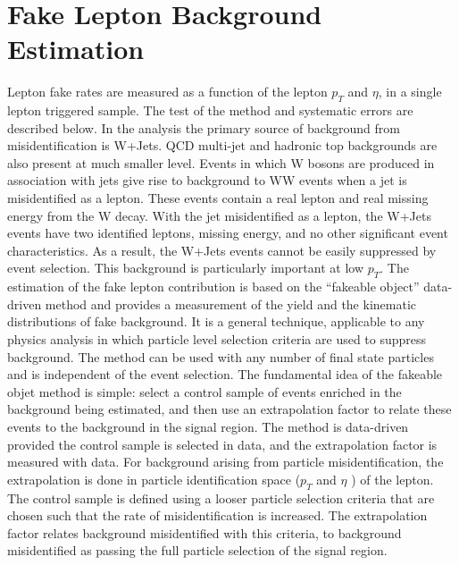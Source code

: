 \section{Fake Lepton Background Estimation}
\label{fk}
Lepton fake rates are measured as a
function of the lepton $p_T$ and $\eta$, in a single lepton triggered sample. The test of the method and
systematic errors are described below.
In the analysis
the primary source of background from misidentification is W+Jets. QCD multi-jet and hadronic top backgrounds
are also present at much smaller level. Events in which W bosons are produced in association
with jets give rise to background to WW events when a jet is misidentified as a lepton. These
events contain a real lepton and real missing energy from the W decay. With the jet misidentified 
as a lepton, the W+Jets events have two identified leptons, missing energy, and no other
significant event characteristics. As a result, the W+Jets events cannot be easily suppressed
by event selection. This background is particularly important at low $p_T$.
The estimation of the fake lepton contribution is based on the ``fakeable object'' data-driven
method and provides a measurement of the yield and the kinematic distributions of fake background. 
It is a general technique, applicable to any physics analysis in which particle level
selection criteria are used to suppress background. The method can be used with any number
of final state particles and is independent of the event selection.
The fundamental idea of the fakeable objet method is simple: select a control sample of events
enriched in the background being estimated, and then use an extrapolation factor to relate these
events to the background in the signal region. The method is data-driven provided the control
sample is selected in data, and the extrapolation factor is measured with data. For background
arising from particle misidentification, the extrapolation is done in particle identification space
($p_T$ and $\eta$ ) of the lepton. The control sample is defined using a looser particle selection criteria
that are chosen such that the rate of misidentification is increased. The extrapolation factor
relates background misidentified with this criteria, to background misidentified as passing the
full particle selection of the signal region.



